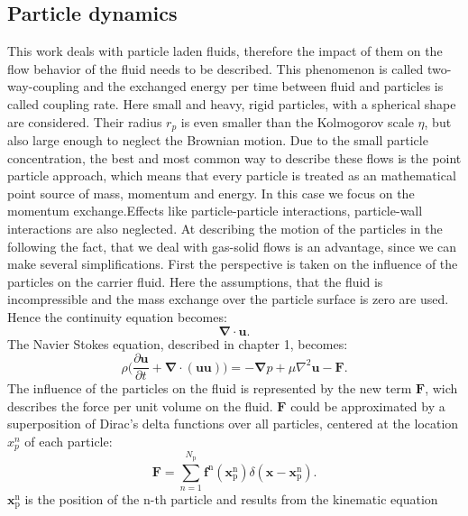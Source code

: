 \documentclass[11pt,a4paper,openany,oneside,parskip=half*]{article}
\renewcommand*\vec[1]{\boldsymbol{#1}}
\begin{document}
\subsection{Particle dynamics} 
This work deals with particle laden fluids, therefore the impact of them on the flow behavior of the fluid needs to be described. This phenomenon is called two-way-coupling and the exchanged energy per time between fluid and particles is called coupling rate. 
\newline
Here small and heavy, rigid particles, with a spherical shape are considered. Their radius $ r_p $ is even smaller than the Kolmogorov scale $ \eta $, but also large enough to neglect the Brownian motion.
\newline
Due to the small particle concentration, the best and most common way to describe these flows is the point particle approach, which means that every particle is treated as an mathematical point source of mass, momentum and energy. In this case we focus on the momentum exchange.Effects like particle-particle interactions, particle-wall interactions are also neglected.  
\newline
At describing the motion of the particles in the following the fact, that we deal with gas-solid flows is an advantage, since we can make several simplifications.
First the perspective is taken on the influence of the particles on the carrier fluid. Here the assumptions, that the fluid is incompressible and the mass exchange over the particle surface is zero are used.
Hence the continuity equation becomes: 
\begin{equation}
\vec{\nabla} \cdot\vec{u}.
\end{equation}
The Navier Stokes equation, described in chapter 1, becomes:
\begin{equation}
\rho\biggl(\frac{\partial{\vec{u}}}{\partial{t}}+\vec{\nabla} \cdot (\vec{u}\vec{u})\biggl) = -\vec{\nabla}p + \mu\nabla^\mathrm{2}\vec{u}-\vec{F}.
\end{equation}
The influence of the particles on the fluid is represented by the new term $\vec{F}$, wich describes the force per unit volume on the fluid.
$\vec{F}$ could be approximated by a superposition of Dirac's delta functions over all particles, centered at the location $x_p^n$ of each particle:
\begin{equation}
\vec{F} = \sum \limits_{n=1}^{N_\mathrm{p}} \vec{f}^\mathrm{n}(\vec{x}_\mathrm{p}^\mathrm{n})\delta(\vec{x}-\vec{x}_\mathrm{p}^\mathrm{n}).
\end{equation}
$\vec{x}_\mathrm{p}^\mathrm{n} $ is the position of the n-th particle and results from the kinematic equation 
\end{document}
